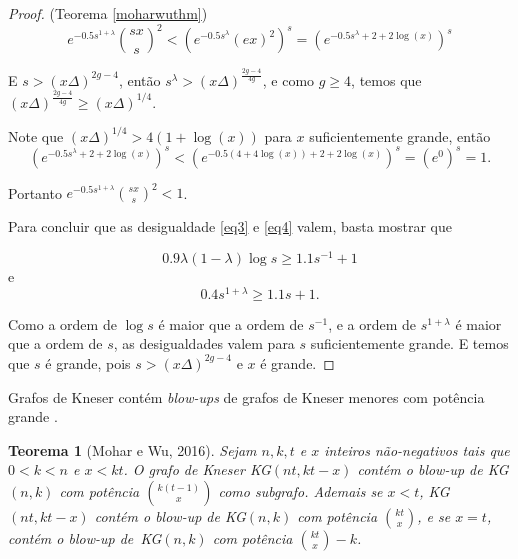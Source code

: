 \documentclass{article}
\newtheorem{teorema}{Teorema}[section]
\begin{document}
\begin{proof}{(Teorema \ref{moharwuthm})}
\[e^{-0.5s^{1+\lambda}}\binom{sx}{s}^2 < \left(e^{-0.5s^{\lambda}}(ex)^2\right)^s = \left(e^{-0.5s^\lambda + 2 + 2\log(x)}\right)^s\]

E $s > (x\Delta)^{2g-4}$, então $s^\lambda > (x\Delta)^{\frac{2g-4}{4g}}$, e como $g \geq 4$, temos que $(x\Delta)^{\frac{2g-4}{4g}} \geq (x\Delta)^{1/4}$. 

Note que $(x\Delta)^{1/4} > 4(1+\log(x))$ para $x$ suficientemente grande, então \[\left(e^{-0.5s^\lambda + 2 + 2\log(x)}\right)^s < \left(e^{-0.5(4+4\log(x)) + 2 + 2\log(x)}\right)^s = (e^0)^s = 1.\]

Portanto $e^{-0.5s^{1+\lambda}}\binom{sx}{s}^2 < 1$.

Para concluir que as desigualdade \ref{eq3} e \ref{eq4} valem, basta mostrar que

\[0.9\lambda(1-\lambda)\log s \geq 1.1s^{-1} + 1\]
e
\[0.4s^{1+\lambda}\geq 1.1s + 1.\]

Como a ordem de $\log s$ é maior que a ordem de $s^{-1}$, e a ordem de $s^{1+\lambda}$ é maior que a ordem de $s$, as desigualdades valem para $s$ suficientemente grande. E temos que $s$ é grande, pois $s > (x\Delta)^{2g-4}$ e $x$ é grande.
\end{proof}

Grafos de Kneser contém \textit{blow-ups} de grafos de Kneser menores com potência grande \cite{mohar2016dichromatic}.

\begin{teorema}[Mohar e Wu, 2016]\label{moharwukn}
Sejam $n,k,t$ e $x$ inteiros não-negativos tais que $0 < k < n$ e $x < kt$. O grafo de Kneser KG$(nt, kt-x)$ contém o \textit{blow-up} de KG$(n,k)$ com potência $\binom{k(t-1)}{x}$ como subgrafo. Ademais se $x < t$, KG$(nt, kt-x)$ contém o \textit{blow-up} de KG$(n,k)$ com potência $\binom{kt}{x}$, e se $x = t$, contém o \textit{blow-up} de~KG$(n,k)$ com potência $\binom{kt}{x}-k$.
\end{teorema}
\end{document}

